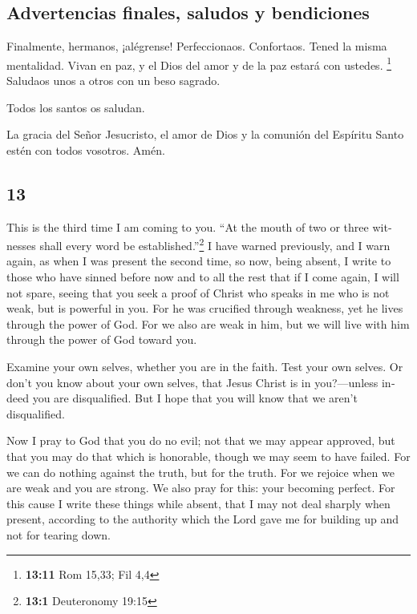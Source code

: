 \begin{paracol}{2}
\hypertarget{advertencias-finales-saludos-y-bendiciones}{%
\subsection{Advertencias finales, saludos y
bendiciones}\label{advertencias-finales-saludos-y-bendiciones}}

 Finalmente, hermanos, ¡alégrense! Perfeccionaos.
Confortaos. Tened la misma mentalidad. Vivan en paz, y el Dios del amor
y de la paz estará con ustedes. \footnote{\textbf{13:11} Rom 15,33; Fil
  4,4}  Saludaos unos a otros con un beso sagrado.

 Todos los santos os saludan.

 La gracia del Señor Jesucristo, el amor de Dios y la
comunión del Espíritu Santo estén con todos vosotros. Amén.
\switchcolumn \begin{otherlanguage}{english}

\hypertarget{section-25}{%
\section{13}\label{section-25}}

 This is the third time I am coming to you. ``At the mouth
of two or three witnesses shall every word be established.''\footnote{\textbf{13:1}
  Deuteronomy 19:15}  I have warned previously, and I warn
again, as when I was present the second time, so now, being absent, I
write to those who have sinned before now and to all the rest that if I
come again, I will not spare,  seeing that you seek a
proof of Christ who speaks in me who is not weak, but is powerful in
you.  For he was crucified through weakness, yet he lives
through the power of God. For we also are weak in him, but we will live
with him through the power of God toward you.

 Examine your own selves, whether you are in the faith.
Test your own selves. Or don't you know about your own selves, that
Jesus Christ is in you?---unless indeed you are disqualified.
 But I hope that you will know that we aren't
disqualified.

 Now I pray to God that you do no evil; not that we may
appear approved, but that you may do that which is honorable, though we
may seem to have failed.  For we can do nothing against
the truth, but for the truth.  For we rejoice when we are
weak and you are strong. We also pray for this: your becoming perfect.
 For this cause I write these things while absent, that I
may not deal sharply when present, according to the authority which the
Lord gave me for building up and not for tearing down.


\end{otherlanguage}
\end{paracol}
